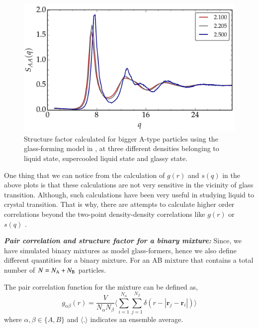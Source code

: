     \begin{figure}[hbt!]
	\includegraphics[width=14cm]{figs/fig_sq.pdf}
	\centering
	\caption[{\em Structure factor}]{Structure factor calculated for bigger A-type particles using the glass-forming model in \cite{vaibhav2022finite}, at three different densities belonging to liquid state, supercooled liquid state and glassy state.\label{fig_sq}}
    \end{figure}
    
    One thing that we can notice from the calculation of $g(r)$ and $s(q)$ in the above plots is that these calculations are not very sensitive in the vicinity of glass transition. Although, such calculations have been very useful in studying liquid to crystal transition. That is why, there are attempts to calculate higher order correlations beyond the two-point density-density correlations like $g(r)$ or $s(q)$ \cite{coslovich2013static,karmakar2014growing,luo2022many}. 
    
    {\bf \em Pair correlation and structure factor for a binary mixture:} Since, we have simulated binary mixtures as model glass-formers, hence we also define different quantities for a binary mixture. For an AB mixture that contains a total number of $N = N_{\rm A} + N_{\rm B}$ particles.  
    
    The pair correlation function for the mixture can be defined as,
    \begin{equation}
        g_{\alpha\beta}(r)=\frac{V}{N_{\alpha}N_{\beta}} \langle \sum_{i=1}^{N_{\alpha}} \sum_{j=1}^{N_{\beta}} \delta(r-|\textbf{r}_j-\textbf{r}_i|)\rangle
    \end{equation}
    where $\alpha,\beta \in \{A,B\}$ and $\langle . \rangle$ indicates an ensemble average.
    
